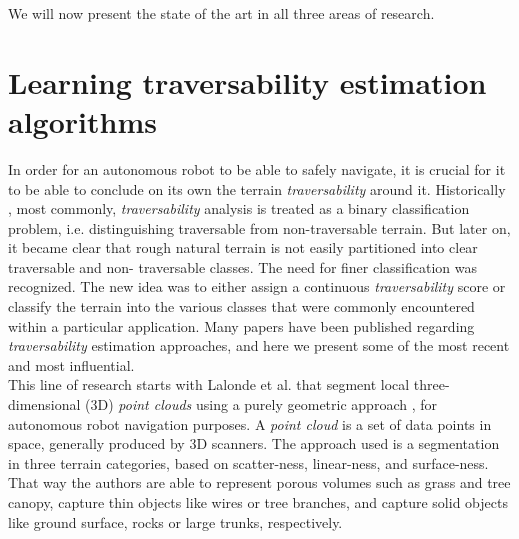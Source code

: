 \documentclass[12pt,a4paper]{report}
\newcommand{\etal}[1]{#1 et al.}
\newcommand{\term}{\textit}
\newcommand{\acronym}{\MakeUppercase}
\begin{document}
	We will now present the state of the art in all three areas of research.
	\\
	
	\section{Learning traversability estimation algorithms}
	\label{sec:bg:trav}
	
	In order for an autonomous robot to be able to safely navigate, it is crucial 
	for it to be able to conclude on its own the terrain \term{traversability} 
	around it. Historically \cite{Papadakis}, most commonly, \term{traversability} 
	analysis is treated as a binary classification problem, i.e. distinguishing 
	traversable from non-traversable terrain. But later on, it became clear that 
	rough natural terrain is not easily partitioned into clear traversable and non-
	traversable classes. The need for finer classification was recognized. The new 
	idea was to either assign a continuous \term{traversability} score or classify 
	the terrain into the various classes that were commonly encountered within a 
	particular application. Many papers have been published regarding 
	\term{traversability} estimation approaches, and here we present some of the 
	most recent and most influential.
	\\
	
	This line of research starts with \etal{Lalonde} that segment local three-
	dimensional (\acronym{3d}) \term{point clouds} using a purely geometric 
	approach \cite{Lalonde}, for autonomous robot navigation purposes. A 
	\term{point cloud} is a set of data points in space, generally produced by 
	\acronym{3d} scanners. The approach used is a segmentation in three terrain 
	categories, based on scatter-ness, linear-ness, and surface-ness. That way 
	the authors are able to represent porous volumes such as grass and tree canopy, 
	capture thin objects like wires or tree branches, and capture solid objects 
	like ground surface, rocks or large trunks, respectively.
	\\	
	
\end{document}
